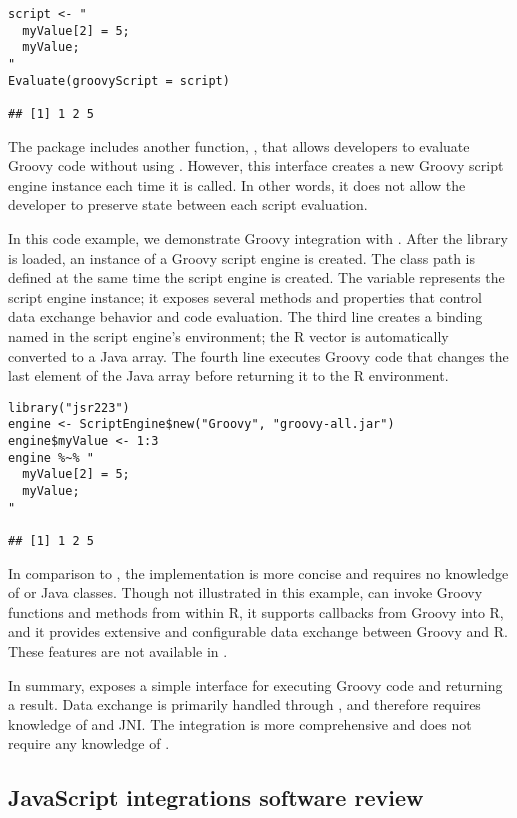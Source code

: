 \begin{verbatim}
script <- "
  myValue[2] = 5;
  myValue;
"
Evaluate(groovyScript = script)

## [1] 1 2 5
\end{verbatim}

The  package includes another function, , that allows developers to evaluate Groovy code without using . However, this interface creates a new Groovy script engine instance each time it is called. In other words, it does not allow the developer to preserve state between each script evaluation.

In this code example, we demonstrate Groovy integration with . After the library is loaded, an instance of a Groovy script engine is created. The class path is defined at the same time the script engine is created. The variable  represents the script engine instance; it exposes several methods and properties that control data exchange behavior and code evaluation. The third line creates a binding named  in the script engine's environment; the R vector is automatically converted to a Java array. The fourth line executes Groovy code that changes the last element of the  Java array before returning it to the R environment.

\begin{verbatim}
library("jsr223")
engine <- ScriptEngine$new("Groovy", "groovy-all.jar")
engine$myValue <- 1:3
engine %~% "
  myValue[2] = 5;
  myValue;
"

## [1] 1 2 5
\end{verbatim}

In comparison to , the  implementation is more concise and requires no knowledge of  or Java classes. Though not illustrated in this example,  can invoke Groovy functions and methods from within R, it supports callbacks from Groovy into R, and it provides extensive and configurable data exchange between Groovy and R. These features are not available in .

In summary,  exposes a simple interface for executing Groovy code and returning a result. Data exchange is primarily handled through , and therefore requires knowledge of  and JNI. The  integration is more comprehensive and does not require any knowledge of .

\hypertarget{javascript-integrations}{}
\subsection{JavaScript integrations software review}

